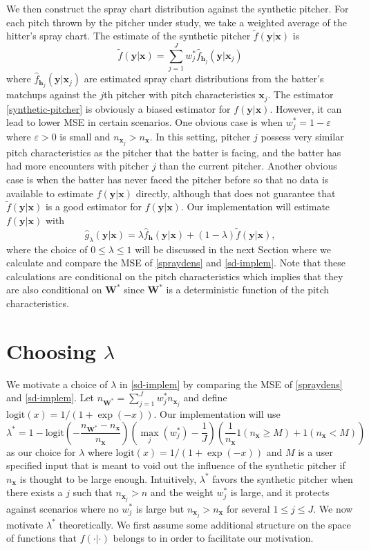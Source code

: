\documentclass[11pt]{article}
\newcommand{\W}{\textbf{W}}
\newcommand{\y}{\textbf{y}}
\newcommand{\x}{\textbf{x}}
\newcommand{\h}{\textbf{h}}
\newcommand{\Wstar}{\W^{\textstyle{*}}}
\newcommand{\wstar}{w^{\textstyle{*}}}
\newcommand{\lamstar}{\lambda^{\textstyle{*}}}
\begin{document}
We then construct the spray chart distribution against the synthetic pitcher. For each pitch thrown by the pitcher under study, we take a weighted average of the hitter's spray chart. The estimate of the synthetic pitcher $\tilde{f}(\y|\x)$ is  
\begin{equation} \label{synthetic-pitcher}
  \tilde{f}(\y|\x) = \sum_{j=1}^J \wstar_j\hat{f}_{\h_j}(\y|\x_j)
\end{equation}
where $\hat{f}_{\h_j}(\y|\x_j)$ are estimated spray chart distributions from the batter's matchups against the $j$th pitcher with pitch characteristics $\x_j$. The estimator \eqref{synthetic-pitcher} is obviously a biased estimator for $f(\y|\x)$. However, it can lead to lower MSE in certain scenarios. One obvious case is when $\wstar_j = 1 - \varepsilon$ where $\varepsilon > 0$ is small and $n_{\x_j} > n_{\x}$. In this setting, pitcher $j$ possess very similar pitch characteristics as the pitcher that the batter is facing, and the batter has had more encounters with pitcher $j$ than the current pitcher. Another obvious case is when the batter has never faced the pitcher before so that no data is available to estimate $f(\y|\x)$ directly, although that does not guarantee that $\tilde{f}(\y|\x)$ is a good estimator for $f(\y|\x)$. Our implementation will estimate $f(\y|\x)$ with
\begin{equation} \label{sd-implem}
  \hat{g}_{\lambda}(\y|\x) = \lambda \hat f_\h(\y|\x) + (1 - \lambda)\tilde{f}(\y|\x),
\end{equation}
where the choice of $0 \leq \lambda \leq 1$ will be discussed in the next Section where we  calculate and compare the MSE of \eqref{spraydens} and \eqref{sd-implem}. Note that these calculations are conditional on the pitch characteristics which implies that they are also conditional on $\Wstar$ since $\Wstar$ is a deterministic function of the pitch characteristics.



\section{Choosing $\lambda$}

We motivate a choice of $\lambda$ in \eqref{sd-implem} by comparing the MSE of \eqref{spraydens} and \eqref{sd-implem}. Let $n_{\Wstar} = \sum_{j=1}^J \wstar_j n_{\x_j}$ and define $\text{logit}(x) = 1/(1 + \exp(-x))$. Our implementation will use 
$$
  \lamstar = 1 - \text{logit}\left(-\frac{n_{\Wstar} - n_\x}{n_\x}\right)
    \left(\max_j(\wstar_j) - \frac{1}{J}\right)
    \left(\frac{1}{n_\x}1(n_\x \geq M) + 1(n_\x < M) \right)
$$
as our choice for $\lambda$ where $\text{logit}(x) = 1/(1 + \exp(-x))$ and $M$ is a user specified input that is meant to void out the influence of the synthetic pitcher if $n_\x$ is thought to be large enough. Intuitively, $\lamstar$ favors the synthetic pitcher when there exists a $j$ such that $n_{\x_j} > n$ and the weight $\wstar_j$ is large, and it protects against scenarios where no $\wstar_j$ is large but $n_{\x_j} > n_{\x}$ for several $1 \leq j \leq J$. We now motivate $\lamstar$ theoretically. We first assume some additional structure on the space of functions that $f(\cdot|\cdot)$ belongs to in order to facilitate our motivation.
\end{document}
